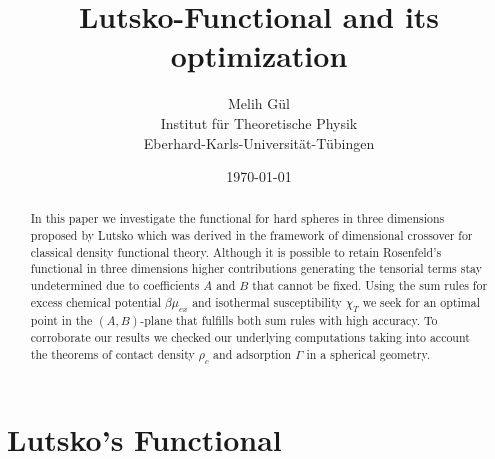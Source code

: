 \documentclass{article}
\title{Lutsko-Functional and its optimization}
\author{Melih G\"ul  \\
	Institut f\"ur Theoretische Physik \\
	Eberhard-Karls-Universit\"at-T\"ubingen  \\
	}
\date{\today}
\begin{document}
\maketitle


\begin{abstract}
In this paper we investigate the functional for hard spheres in three dimensions proposed by Lutsko which was derived in the framework of dimensional crossover for classical density functional theory. Although it is possible to retain Rosenfeld's functional in three dimensions higher contributions generating the tensorial terms stay undetermined due to coefficients $A$ and $B$ that cannot be fixed. Using the sum rules for excess chemical potential $\beta\mu_{ex}$ and isothermal susceptibility $\chi_T$ we seek for an optimal point in the $(A, B)$-plane that fulfills both sum rules with high accuracy. To corroborate our results we checked our underlying computations taking into account the theorems of contact density $\rho_c$ and adsorption $\Gamma$ in a spherical geometry.
\end{abstract}
\section{Lutsko's Functional}
\end{document}
